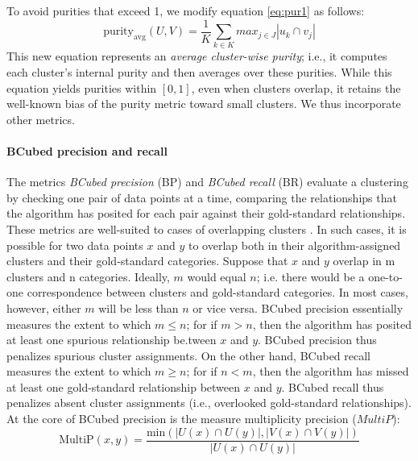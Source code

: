 To avoid purities that exceed 1, we modify equation \eqref{eq:pur1} as follows: 
\begin{equation} \label{eq:pur2}
\text{purity}_{\text{avg}}(U, V) =  \frac{1}{K} \sum_{k \in K} max_{j \in J} |u_k \cap v_j|
\end{equation}
This new equation represents an \emph{average cluster-wise purity}; i.e., it computes each cluster's internal purity and then averages over these purities. %
While this equation yields purities within $[0, 1]$, even 
when clusters overlap, it retains the well-known bias of the purity metric toward small clusters. We thus incorporate other metrics. 

\paragraph{BCubed precision and recall}
The metrics \emph{BCubed precision} (BP) and \emph{BCubed recall} (BR) \citep{bagga-and-baldwin:1998} evaluate a clustering by checking one 
pair of data points at a time, comparing the relationships that the algorithm has posited for each pair against their 
gold-standard relationships. These metrics are well-suited to cases of overlapping clusters \citep{amigo-et-al:2009}. 
In such cases, it is possible for two data points $x$ and $y$ to overlap both in their algorithm-assigned clusters and their 
gold-standard categories. Suppose that $x$ and $y$ overlap in m clusters and n categories. Ideally, $m$ would 
equal $n$; 
i.e. there would be a one-to-one correspondence between clusters and gold-standard categories. 
In most cases, however, either $m$ will be less than $n$ or vice versa. BCubed precision essentially 
measures the extent to which $m \leq n$; for if $m>n$, then the algorithm has posited at least one 
spurious relationship be.tween $x$ and $y$. BCubed precision thus penalizes spurious cluster assignments. 
On the other hand, BCubed recall measures the extent to which $m \geq n$; for if $n<m$, then the algorithm 
has missed at least one gold-standard relationship between $x$ and $y$. BCubed recall thus 
penalizes absent cluster assignments (i.e., overlooked gold-standard relationships). 
At the core of BCubed precision is the measure multiplicity precision ($MultiP$):
\begin{equation}
\text{MultiP}(x,y) = \frac{\text{min}(|U(x)\cap U(y)|, |V(x) \cap V(y)|)}{|U(x) \cap U(y)|}
\end{equation}
